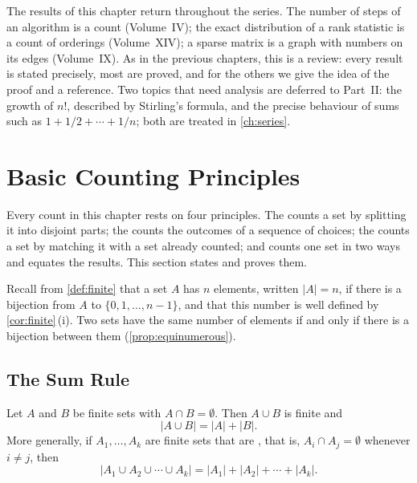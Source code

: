 The results of this chapter return throughout the series. The number of steps of an algorithm is a count (Volume~IV); the exact distribution of a rank statistic is a count of orderings (Volume~XIV); a sparse matrix is a graph with numbers on its edges (Volume~IX). As in the previous chapters, this is a review: every result is stated precisely, most are proved, and for the others we give the idea of the proof and a reference. Two topics that need analysis are deferred to Part~II: the growth of $n!$, described by Stirling's formula, and the precise behaviour of sums such as $1+1/2+\cdots+1/n$; both are treated in \cref{ch:series}.

\section{Basic Counting Principles}
\label{sec:counting-principles}

Every count in this chapter rests on four principles. The  counts a set by splitting it into disjoint parts; the  counts the outcomes of a sequence of choices; the  counts a set by matching it with a set already counted; and  counts one set in two ways and equates the results. This section states and proves them.

Recall from \cref{def:finite} that a set $A$ has $n$ elements, written $|A|=n$, if there is a bijection from $A$ to $\{0,1,\ldots,n-1\}$, and that this number is well defined by \cref{cor:finite}\,(i). Two sets have the same number of elements if and only if there is a bijection between them (\cref{prop:equinumerous}).

\subsection{The Sum Rule}

\begin{theorem}
\label{thm:sum-rule}
Let $A$ and $B$ be finite sets with $A\cap B=\emptyset$. Then $A\cup B$ is finite and
\[
|A\cup B|=|A|+|B| .
\]
More generally, if $A_1,\ldots,A_k$ are finite sets that are , that is, $A_i\cap A_j=\emptyset$ whenever $i\ne j$, then
\[
|A_1\cup A_2\cup\cdots\cup A_k|=|A_1|+|A_2|+\cdots+|A_k| .
\]
\end{theorem}

